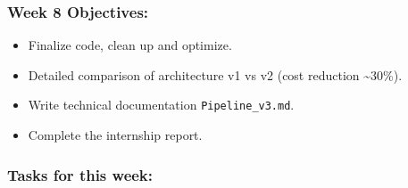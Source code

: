 \hypertarget{week-8-objectives}{%
\subsubsection{Week 8 Objectives:}}

\begin{itemize}
\tightlist
\item
  Finalize code, clean up and optimize.
\item
  Detailed comparison of architecture v1 vs v2 (cost reduction
  \textasciitilde30\%).
\item
  Write technical documentation \texttt{Pipeline\_v3.md}.
\item
  Complete the internship report.
\end{itemize}

\hypertarget{tasks-for-this-week}{%
\subsubsection{Tasks for this week:}}

